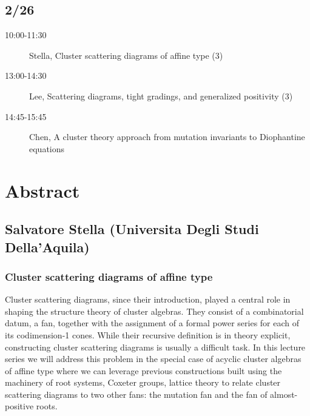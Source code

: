 \documentclass[
]{article}
\begin{document}
\subsection*{2/26}\label{section-2}

\begin{description}
\item[10:00-11:30]
Stella, Cluster scattering diagrams of affine type (3)
\item[13:00-14:30]
Lee, Scattering diagrams, tight gradings, and generalized positivity (3)
\item[14:45-15:45]
Chen, A cluster theory approach from mutation invariants to Diophantine
equations
\end{description}

\section*{Abstract}\label{abstract}

\subsection*{Salvatore Stella (Universita Degli Studi
Della'Aquila)}\label{salvatore-stella-universita-degli-studi-dellaaquila}

\subsubsection*{Cluster scattering diagrams of affine
type}\label{cluster-scattering-diagrams-of-affine-type}

Cluster scattering diagrams, since their introduction, played a central
role in shaping the structure theory of cluster algebras. They consist
of a combinatorial datum, a fan, together with the assignment of a
formal power series for each of its codimension-1 cones. While their
recursive definition is in theory explicit, constructing cluster
scattering diagrams is usually a difficult task. In this lecture series
we will address this problem in the special case of acyclic cluster
algebras of affine type where we can leverage previous constructions
built using the machinery of root systems, Coxeter groups, lattice
theory to relate cluster scattering diagrams to two other fans: the
mutation fan and the fan of almost-positive roots.
\end{document}
